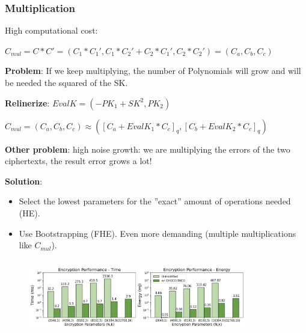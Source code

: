 \documentclass[10pt]{beamer}
\begin{document}
\begin{frame}[noframenumbering]

    \frametitle{Multiplication}

    High computational cost:
    \vspace{-0.15cm}

    $C_{mul} = C*C' = (C_1*C_1',C_1*C_2'+C_2*C_1', C_2*C_2') = (C_a,C_b,C_c)$
    \vspace{-0.15cm}

    \textbf{Problem}: If we keep multiplying, the number of Polynomials will grow and will be needed
    the squared of the SK.

    \textbf{Relinerize}:
    $EvalK = (-PK_1+SK^2, PK_2)$

    $C_{mul} = (C_a, C_b, C_c)\approx ([C_a+EvalK_1*C_c]_q, [C_b+EvalK_2*C_c]_q)$

    \textbf{Other problem}: high noise growth: we are multiplying the errors of the two ciphertexts, the result error
    grows a lot!
    \vspace{-0.1cm}

    \textbf{Solution}: \vspace{-0.3cm}
    \begin{itemize} \vspace{-0.2cm}
        \item Select the lowest parameters for the ''exact'' amount  of operations needed (HE). \vspace{-0.2cm}
            \vspace{-0.25cm}
        \item Use Bootstrapping  (FHE). Even more demanding (multiple multiplications like $C_{mul}$).
    \end{itemize}
\end{frame}

\begin{frame}[noframenumbering]
\frametitle{}
\begin{figure}
    \includegraphics[width=0.85\textwidth]{SW_comp.png}
\end{figure}

\end{frame}
\end{document}
